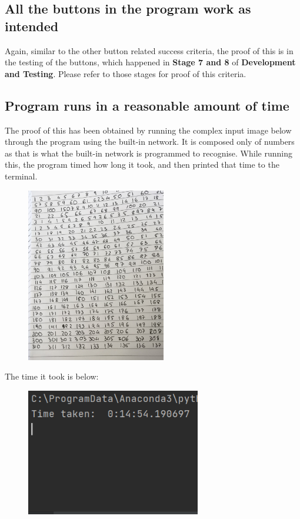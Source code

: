 \documentclass{report}
\begin{document}
\subsection{All the buttons in the program work as intended}
Again, similar to the other button related success criteria, the proof of this is in the testing of the buttons, which happened in \textbf{Stage 7 and 8} of \textbf{Development and Testing}. Please refer to those stages for proof of this criteria.
\newpage

\subsection{Program runs in a reasonable amount of time}
The proof of this has been obtained by running the complex input image below through the program using the built-in network. It is composed only of numbers as that is what the built-in network is programmed to recognise. While running this, the program timed how long it took, and then printed that time to the terminal.
\begin{figure}[H]
    \centering
    \includegraphics[height=3in]{Images/Evaluation/Success Criteria Proof/Complex Test Image.jpg}
\end{figure}
\noindent The time it took is below:
\begin{figure}[H]
    \centering
    \includegraphics[width=3in]{Images/Evaluation/Success Criteria Proof/Time taken for complex sample to run.png}
\end{figure}
\end{document}
